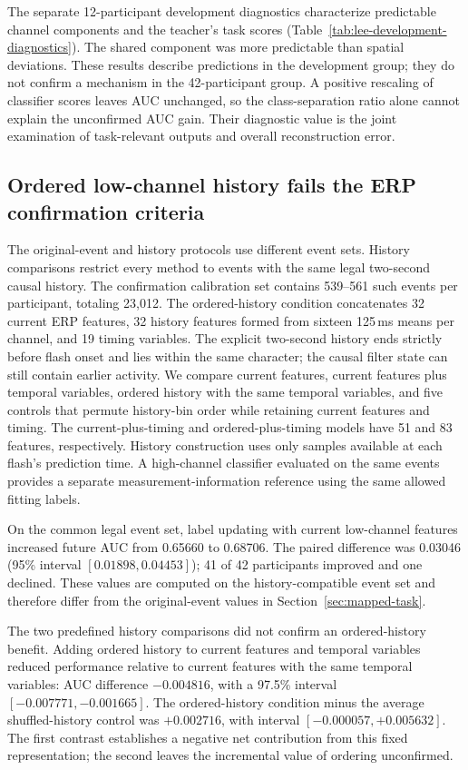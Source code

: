 \documentclass[11pt,a4paper]{article}
\begin{document}
The separate 12-participant development diagnostics characterize predictable channel components and the teacher's task scores (Table~\ref{tab:lee-development-diagnostics}). The shared component was more predictable than spatial deviations. These results describe predictions in the development group; they do not confirm a mechanism in the 42-participant group. A positive rescaling of classifier scores leaves AUC unchanged, so the class-separation ratio alone cannot explain the unconfirmed AUC gain. Their diagnostic value is the joint examination of task-relevant outputs and overall reconstruction error.

\subsection{Ordered low-channel history fails the ERP confirmation criteria}
\label{sec:history}

The original-event and history protocols use different event sets. History comparisons restrict every method to events with the same legal two-second causal history. The confirmation calibration set contains 539--561 such events per participant, totaling 23,012. The ordered-history condition concatenates 32 current ERP features, 32 history features formed from sixteen 125\,ms means per channel, and 19 timing variables. The explicit two-second history ends strictly before flash onset and lies within the same character; the causal filter state can still contain earlier activity. We compare current features, current features plus temporal variables, ordered history with the same temporal variables, and five controls that permute history-bin order while retaining current features and timing. The current-plus-timing and ordered-plus-timing models have 51 and 83 features, respectively. History construction uses only samples available at each flash's prediction time. A high-channel classifier evaluated on the same events provides a separate measurement-information reference using the same allowed fitting labels.

On the common legal event set, label updating with current low-channel features increased future AUC from 0.65660 to 0.68706. The paired difference was 0.03046 (95\% interval $[0.01898,0.04453]$); 41 of 42 participants improved and one declined. These values are computed on the history-compatible event set and therefore differ from the original-event values in Section~\ref{sec:mapped-task}.

The two predefined history comparisons did not confirm an ordered-history benefit. Adding ordered history to current features and temporal variables reduced performance relative to current features with the same temporal variables: AUC difference $-0.004816$, with a 97.5\% interval $[-0.007771,-0.001665]$. The ordered-history condition minus the average shuffled-history control was $+0.002716$, with interval $[-0.000057,+0.005632]$. The first contrast establishes a negative net contribution from this fixed representation; the second leaves the incremental value of ordering unconfirmed.
\end{document}
